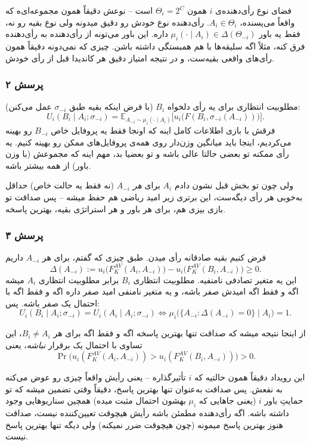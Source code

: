 \documentclass[12pt, a4paper]{article}
\begin{document}
فضای نوع رأی‌دهنده‌ی $i$ همون $\Theta_i=2^C$ است -- نوعش دقیقاً همون مجموعه‌ای‌ه که واقعاً می‌پسنده، $A_i\in\Theta_i$. رأی‌دهنده نوع خودش رو دقیق میدونه ولی نوع بقیه رو نه، فقط یه باور $\mu_i(\cdot\mid A_i)\in\Delta(\Theta_{-i})$ داره. این باور می‌تونه از رأی‌دهنده به رأی‌دهنده فرق کنه، مثلاً اگه سلیقه‌ها با هم همبستگی داشته باشن. چیزی که نمی‌دونه دقیقاً همون رأی‌های واقعی بقیه‌ست، و در نتیجه امتیاز دقیق هر کاندیدا قبل از رأی خودش.

\subsubsection*{پرسش ۲}

مطلوبیت انتظاری برای یه رأی دلخواه $B_i$ (با فرض اینکه بقیه طبق $\sigma_{-i}$ عمل می‌کنن):
\[
U_i(B_i\mid A_i;\sigma_{-i}) = \mathbb{E}_{A_{-i}\sim\mu_i(\cdot\mid A_i)}\Big[u_i\big(F(B_i,\sigma_{-i}(A_{-i}))\big)\Big].
\]
فرقش با بازی اطلاعات کامل اینه که اونجا فقط یه پروفایل خاص $B_{-i}$ رو بهینه می‌کردیم، اینجا باید میانگین وزن‌دار روی همه‌ی پروفایل‌های ممکن رو بهینه کنیم. یه رأی ممکنه تو بعضی حالتا عالی باشه و تو بعضیا بد، مهم اینه که مجموعش (با وزن باور) از همه بیشتر باشه.

ولی چون تو بخش قبل نشون دادم $A_i$ برای \emph{هر} $A_{-i}$ (نه فقط یه حالت خاص) حداقل به‌خوبی هر رأی دیگه‌ست، این برتری زیر امید ریاضی هم حفظ میشه -- پس صداقت تو بازی بیزی هم، برای هر باور و هر استراتژی بقیه، بهترین پاسخه.

\subsubsection*{پرسش ۳}

فرض کنیم بقیه صادقانه رأی میدن. طبق چیزی که گفتم، برای هر $A_{-i}$ داریم
\[
\Delta(A_{-i}) := u_i\big(F_K^{AV}(A_i,A_{-i})\big) - u_i\big(F_K^{AV}(B_i,A_{-i})\big) \ge 0.
\]
این یه متغیر تصادفی نامنفیه. مطلوبیت انتظاری $B_i$ برابر مطلوبیت انتظاری $A_i$ میشه اگه و فقط اگه امیدش صفر باشه، و یه متغیر نامنفی امید صفر داره اگه و فقط اگه با احتمال یک صفر باشه. پس:
\[
U_i(B_i\mid A_i;\sigma_{-i}) = U_i(A_i\mid A_i;\sigma_{-i}) \iff \mu_i\big(\{A_{-i}: \Delta(A_{-i})=0\}\mid A_i\big)=1.
\]

از اینجا نتیجه میشه که صداقت تنها بهترین پاسخه اگه و فقط اگه برای هر $B_i\ne A_i$، این تساوی با احتمال یک برقرار \emph{نباشه}، یعنی
\[
\Pr\big(u_i(F_K^{AV}(A_i,A_{-i})) > u_i(F_K^{AV}(B_i,A_{-i}))\big) > 0.
\]

این رویداد دقیقاً همون حالتیه که $i$ تأثیرگذاره -- یعنی رأیش واقعاً چیزی رو عوض می‌کنه به نفعش. پس صداقت به‌عنوان تنها بهترین پاسخ، دقیقاً وقتی تضمین میشه که تو حمایتِ باور $i$ (یعنی جاهایی که $\mu_i$ بهشون احتمال مثبت میده) همچین سناریوهایی وجود داشته باشه. اگه رأی‌دهنده مطمئن باشه رأیش هیچوقت تعیین‌کننده نیست، صداقت هنوز بهترین پاسخ میمونه (چون هیچوقت ضرر نمیکنه) ولی دیگه تنها بهترین پاسخ نیست.
\end{document}
